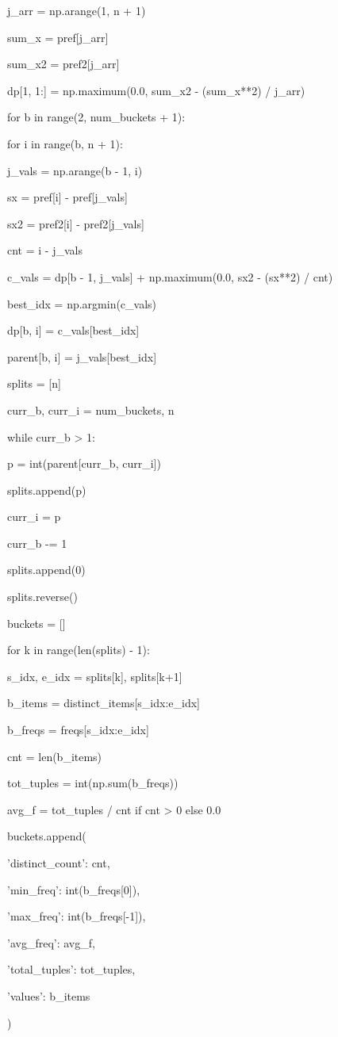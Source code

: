 \documentclass[11pt,a4paper]{article}
\begin{document}
j\_arr = np.arange(1, n + 1)

sum\_x = pref[j\_arr]

sum\_x2 = pref2[j\_arr]

dp[1, 1:] = np.maximum(0.0, sum\_x2 - (sum\_x**2) / j\_arr)


for b in range(2, num\_buckets + 1):

for i in range(b, n + 1):

j\_vals = np.arange(b - 1, i)

sx = pref[i] - pref[j\_vals]

sx2 = pref2[i] - pref2[j\_vals]

cnt = i - j\_vals

c\_vals = dp[b - 1, j\_vals] + np.maximum(0.0, sx2 - (sx**2) / cnt)

best\_idx = np.argmin(c\_vals)

dp[b, i] = c\_vals[best\_idx]

parent[b, i] = j\_vals[best\_idx]


splits = [n]

curr\_b, curr\_i = num\_buckets, n

while curr\_b > 1:

p = int(parent[curr\_b, curr\_i])

splits.append(p)

curr\_i = p

curr\_b -= 1

splits.append(0)

splits.reverse()


buckets = []

for k in range(len(splits) - 1):

s\_idx, e\_idx = splits[k], splits[k+1]

b\_items = distinct\_items[s\_idx:e\_idx]

b\_freqs = freqs[s\_idx:e\_idx]

cnt = len(b\_items)

tot\_tuples = int(np.sum(b\_freqs))

avg\_f = tot\_tuples / cnt if cnt > 0 else 0.0

buckets.append({

'distinct\_count': cnt,

'min\_freq': int(b\_freqs[0]),

'max\_freq': int(b\_freqs[-1]),

'avg\_freq': avg\_f,

'total\_tuples': tot\_tuples,

'values': b\_items

})
\end{document}
